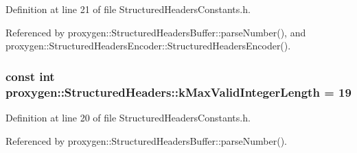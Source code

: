 Definition at line 21 of file Structured\+Headers\+Constants.\+h.



Referenced by proxygen\+::\+Structured\+Headers\+Buffer\+::parse\+Number(), and proxygen\+::\+Structured\+Headers\+Encoder\+::\+Structured\+Headers\+Encoder().

\subsubsection[{k\+Max\+Valid\+Integer\+Length}]{\setlength{\rightskip}{0pt plus 5cm}const int proxygen\+::\+Structured\+Headers\+::k\+Max\+Valid\+Integer\+Length = 19\hspace{0.3cm}{\ttfamily [static]}}\label{namespaceproxygen_1_1StructuredHeaders_a10a15630c1045d489383efa237108d87}


Definition at line 20 of file Structured\+Headers\+Constants.\+h.



Referenced by proxygen\+::\+Structured\+Headers\+Buffer\+::parse\+Number().

